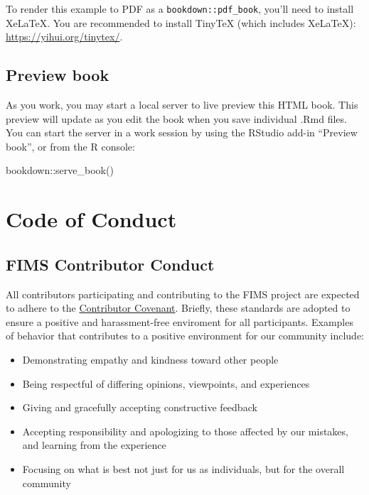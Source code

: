 \documentclass[
]{book}
\newenvironment{Shaded}{\begin{snugshade}}{\end{snugshade}}
\newcommand{\FunctionTok}[1]{\textcolor[rgb]{0.00,0.00,0.00}{#1}}
\newcommand{\NormalTok}[1]{#1}
\newcommand{\SpecialCharTok}[1]{\textcolor[rgb]{0.00,0.00,0.00}{#1}}
\providecommand{\tightlist}{%
  \setlength{\itemsep}{0pt}\setlength{\parskip}{0pt}}
\begin{document}
To render this example to PDF as a \texttt{bookdown::pdf\_book}, you'll need to install XeLaTeX. You are recommended to install TinyTeX (which includes XeLaTeX): \url{https://yihui.org/tinytex/}.

\hypertarget{preview-book}{%
\section{Preview book}\label{preview-book}}

As you work, you may start a local server to live preview this HTML book. This preview will update as you edit the book when you save individual .Rmd files. You can start the server in a work session by using the RStudio add-in ``Preview book'', or from the R console:

\begin{Shaded}
\begin{Highlighting}[]
\NormalTok{bookdown}\SpecialCharTok{::}\FunctionTok{serve\_book}\NormalTok{()}
\end{Highlighting}
\end{Shaded}

\hypertarget{code-of-conduct}{%
\chapter{Code of Conduct}\label{code-of-conduct}}

\hypertarget{fims-contributor-conduct}{%
\section{FIMS Contributor Conduct}\label{fims-contributor-conduct}}

All contributors participating and contributing to the FIMS project are expected to adhere to the \href{https://www.contributor-covenant.org/version/2/1/code_of_conduct/}{Contributor Covenant}. Briefly, these standards are adopted to ensure a positive and harassment-free enviroment for all participants. Examples of behavior that contributes to a positive environment for our community include:

\begin{itemize}
\tightlist
\item
  Demonstrating empathy and kindness toward other people
\item
  Being respectful of differing opinions, viewpoints, and experiences
\item
  Giving and gracefully accepting constructive feedback
\item
  Accepting responsibility and apologizing to those affected by our mistakes, and learning from the experience
\item
  Focusing on what is best not just for us as individuals, but for the overall community
\end{itemize}
\end{document}
